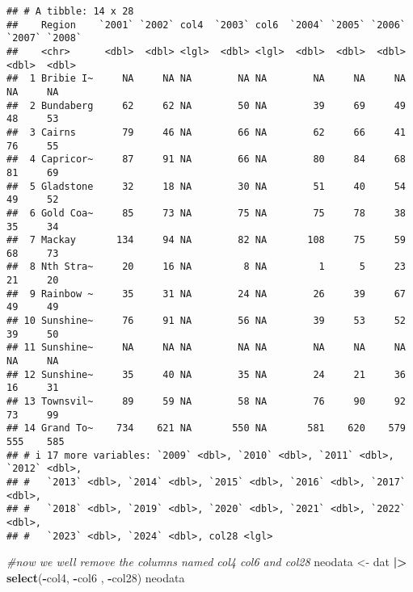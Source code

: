\documentclass[
]{article}
\newenvironment{Shaded}{\begin{snugshade}}{\end{snugshade}}
\newcommand{\CommentTok}[1]{\textcolor[rgb]{0.56,0.35,0.01}{\textit{#1}}}
\newcommand{\FunctionTok}[1]{\textcolor[rgb]{0.13,0.29,0.53}{\textbf{#1}}}
\newcommand{\NormalTok}[1]{#1}
\newcommand{\OtherTok}[1]{\textcolor[rgb]{0.56,0.35,0.01}{#1}}
\newcommand{\SpecialCharTok}[1]{\textcolor[rgb]{0.81,0.36,0.00}{\textbf{#1}}}
\begin{document}
\begin{verbatim}
## # A tibble: 14 x 28
##    Region    `2001` `2002` col4  `2003` col6  `2004` `2005` `2006` `2007` `2008`
##    <chr>      <dbl>  <dbl> <lgl>  <dbl> <lgl>  <dbl>  <dbl>  <dbl>  <dbl>  <dbl>
##  1 Bribie I~     NA     NA NA        NA NA        NA     NA     NA     NA     NA
##  2 Bundaberg     62     62 NA        50 NA        39     69     49     48     53
##  3 Cairns        79     46 NA        66 NA        62     66     41     76     55
##  4 Capricor~     87     91 NA        66 NA        80     84     68     81     69
##  5 Gladstone     32     18 NA        30 NA        51     40     54     49     52
##  6 Gold Coa~     85     73 NA        75 NA        75     78     38     35     34
##  7 Mackay       134     94 NA        82 NA       108     75     59     68     73
##  8 Nth Stra~     20     16 NA         8 NA         1      5     23     21     20
##  9 Rainbow ~     35     31 NA        24 NA        26     39     67     49     49
## 10 Sunshine~     76     91 NA        56 NA        39     53     52     39     50
## 11 Sunshine~     NA     NA NA        NA NA        NA     NA     NA     NA     NA
## 12 Sunshine~     35     40 NA        35 NA        24     21     36     16     31
## 13 Townsvil~     89     59 NA        58 NA        76     90     92     73     99
## 14 Grand To~    734    621 NA       550 NA       581    620    579    555    585
## # i 17 more variables: `2009` <dbl>, `2010` <dbl>, `2011` <dbl>, `2012` <dbl>,
## #   `2013` <dbl>, `2014` <dbl>, `2015` <dbl>, `2016` <dbl>, `2017` <dbl>,
## #   `2018` <dbl>, `2019` <dbl>, `2020` <dbl>, `2021` <dbl>, `2022` <dbl>,
## #   `2023` <dbl>, `2024` <dbl>, col28 <lgl>
\end{verbatim}

\begin{Shaded}
\begin{Highlighting}[]
\CommentTok{\#now we we\textquotesingle{}ll remove the columns named col4 col6 and col28}
\NormalTok{neodata }\OtherTok{\textless{}{-}}\NormalTok{ dat }\SpecialCharTok{|\textgreater{}} \FunctionTok{select}\NormalTok{(}\SpecialCharTok{{-}}\NormalTok{col4, }\SpecialCharTok{{-}}\NormalTok{col6 , }\SpecialCharTok{{-}}\NormalTok{col28)}
\NormalTok{neodata}
\end{Highlighting}
\end{Shaded}
\end{document}
